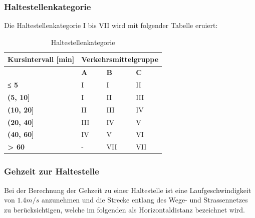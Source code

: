 \subsubsection{Haltestellenkategorie}
\label{Berechnungsmethodik OeVGK18:Haltestellenkategorie}
Die Haltestellenkategorie I bis VII wird mit folgender Tabelle eruiert:

\begin{table}[H]
    \begin{tabular}[c]{l p{4.0cm} p{4.0cm} p{4.0cm}}
        \toprule
        \textbf{Kursintervall [min]}
                                & \multicolumn{3}{c}{\textbf{Verkehrsmittelgruppe}}\\
        \midrule
        \textbf{}
                                & \textbf{A}
                                & \textbf{B}
                                & \textbf{C}\\
        \textbf{≤ 5}
                                & I
                                & I
                                & II\\
        \textbf{(5, 10]}
                                & I
                                & II
                                & III\\
        \textbf{(10, 20]}
                                & II
                                & III
                                & IV\\
        \textbf{(20, 40]}
                                & III
                                & IV
                                & V\\
        \textbf{(40, 60]}
                                & IV
                                & V
                                & VI\\
        \textbf{> 60}
                                & -
                                & VII
                                & VII\\
        \bottomrule
    \end{tabular}
    \caption{Haltestellenkategorie}
    \label{Haltestellenkategorie}
\end{table}

\subsubsection{Gehzeit zur Haltestelle}
\label{Berechnungsmethodik OeVGK18:Gehzeit zur Haltestelle}
Bei der Berechnung der Gehzeit zu einer Haltestelle ist eine Laufgeschwindigkeit von $1.4 m/s$ anzunehmen und die Strecke entlang des Wege- und Strassennetzes zu berücksichtigen, welche im folgenden als Horizontaldistanz bezeichnet wird.

